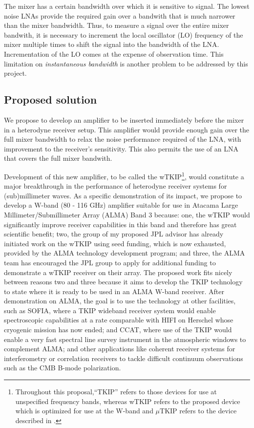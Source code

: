 The mixer has a certain bandwidth over which it is sensitive to signal. The lowest noise LNAs provide the required gain over a bandwith that is much narrower than the mixer bandwidth. Thus, to measure a signal over the entire mixer bandwith, it is necessary to increment the local oscillator (LO) frequency of the mixer multiple times to shift the signal into the bandwidth of the LNA. Incrementation of the LO comes at the expense of observation time. This limitation on \emph{instantaneous bandwidth} is another problem to be addressed by this project. 

\subsection*{Proposed solution}
We propose to develop an amplifier to be inserted immediately before the mixer in a heterodyne receiver setup. This amplifier would provide enough gain over the full mixer bandwidth to relax the noise performance required of the LNA, with improvement to the receiver's sensitivity. This also permits the use of an LNA that covers the full mixer bandwith.
    
Development of this new amplifier, to be called the wTKIP\footnote{Throughout this proposal,``TKIP'' refers to those devices for use at unspecified frequency bands, whereas wTKIP refers to the proposed device which is optimized for use at the W-band and $\mu$TKIP refers to the device described in \cite{Eom2012} \label{foot:TKIP}.}, would constitute a major breakthrough in the performance of heterodyne receiver systems for (sub)millimeter waves. As a specific demonstration of its impact, we propose to develop a W-band  (80 - 116 GHz) amplifier suitable for use in Atacama Large Millimeter/Submillimeter Array (ALMA) Band 3 because: one, the wTKIP would significantly improve receiver capabilities in this band and therefore has great scientific benefit; two, the group of my proposed JPL advisor has already initiated work on the wTKIP using seed funding, which is now exhausted, provided by the ALMA technology development program; and three, the ALMA team has encouraged the JPL group to apply for additional funding to demonstrate a wTKIP receiver on their array. The proposed work fits nicely between reasons two and three because it aims to develop the TKIP technology to  state where it is ready to be used in an ALMA W-band receiver. After demonstration on ALMA, the goal is to use the technology at other facilities, such as SOFIA, where a TKIP wideband receiver system would enable spectroscopic capabilities at a rate comparable with HIFI on Herschel whose cryogenic mission has now ended; and CCAT, where use of the TKIP would enable a very fast spectral line survey instrument in the atmospheric windows to complement ALMA; and other applications like coherent receiver systems for interferometry or correlation receivers to tackle difficult continuum observations such as the CMB B-mode polarization.


